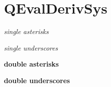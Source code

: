 \chapter{QEval\+Deriv\+Sys}
\hypertarget{index}{}\label{index}
\label{index_md__2home_2msa_2Documents_2QPROJECTS_2QEvalDeriv_2QEvalDerivSys_2README}%
%
 {\itshape single asterisks}

{\itshape single underscores}

{\bfseries{double asterisks}}

{\bfseries{double underscores}} 